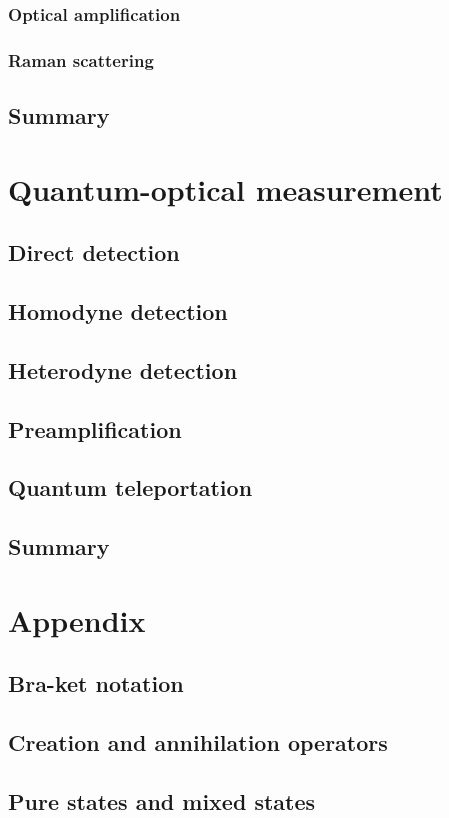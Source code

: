 \documentclass{book}
\begin{document}
\subsection{Optical amplification}
\subsection{Raman scattering}
\section{Summary}

\chapter{Quantum-optical measurement}
\section{Direct detection}
\section{Homodyne detection}
\section{Heterodyne detection}
\section{Preamplification}
\section{Quantum teleportation}
\section{Summary}

\appendix
\chapter{Appendix}
\section{Bra-ket notation}
\section{Creation and annihilation operators}
\section{Pure states and mixed states}
\end{document}
